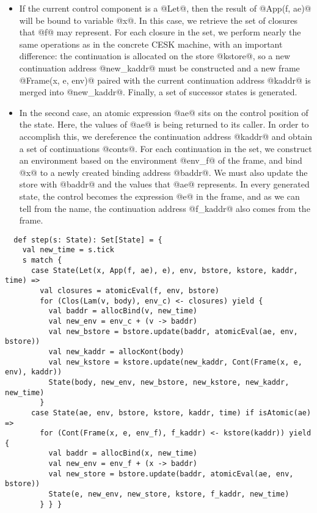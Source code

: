 \documentclass[acmsmall, screen]{acmart}\settopmatter{}
\begin{document}
\begin{itemize}
  \item If the current control component is a @Let@, then the result of @App(f, ae)@ will
    be bound to variable @x@. In this case, we retrieve the set of closures that @f@ may
    represent. For each closure in the set, we perform nearly the same operations as in the
    concrete CESK machine, with an important difference: the continuation is allocated on
    the store @kstore@, so a new continuation address @new_kaddr@ must be constructed and
    a new frame @Frame(x, e, env)@ paired with the current continuation address @kaddr@ is
    merged into @new_kaddr@. Finally, a set of successor states is generated.

  \item In the second case, an atomic expression @ae@ sits on the control position of the
    state. Here, the values of @ae@ is being returned to its caller.
    In order to accomplish this, we dereference the continuation address @kaddr@ and obtain
    a set of continuations @conts@. For each continuation in the set, we construct an
    environment based on the environment @env_f@ of the frame, and bind @x@ to a newly
    created binding address @baddr@. We must also update the store with @baddr@ and the
    values that @ae@ represents. In every generated state, the control becomes the expression
    @e@ in the frame, and as we can tell from the name, the continuation address @f_kaddr@
    also comes from the frame.
\end{itemize}

\begin{lstlisting}
  def step(s: State): Set[State] = {
    val new_time = s.tick
    s match {
      case State(Let(x, App(f, ae), e), env, bstore, kstore, kaddr, time) =>
        val closures = atomicEval(f, env, bstore)
        for (Clos(Lam(v, body), env_c) <- closures) yield {
          val baddr = allocBind(v, new_time)
          val new_env = env_c + (v -> baddr)
          val new_bstore = bstore.update(baddr, atomicEval(ae, env, bstore))
          val new_kaddr = allocKont(body)
          val new_kstore = kstore.update(new_kaddr, Cont(Frame(x, e, env), kaddr))
          State(body, new_env, new_bstore, new_kstore, new_kaddr, new_time)
        }
      case State(ae, env, bstore, kstore, kaddr, time) if isAtomic(ae) =>
        for (Cont(Frame(x, e, env_f), f_kaddr) <- kstore(kaddr)) yield {
          val baddr = allocBind(x, new_time)
          val new_env = env_f + (x -> baddr)
          val new_store = bstore.update(baddr, atomicEval(ae, env, bstore))
          State(e, new_env, new_store, kstore, f_kaddr, new_time)
        } } }
\end{lstlisting}
\end{document}
